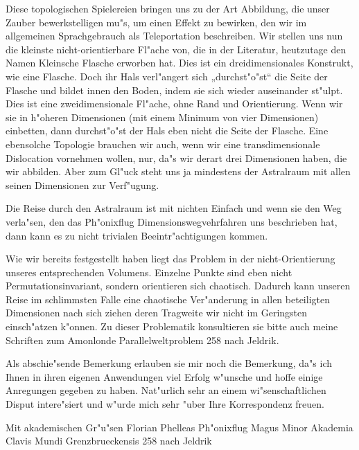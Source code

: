 \documentclass[a5paper,8pt]{book}
\begin{document}
Diese topologischen Spielereien bringen uns zu der Art Abbildung, die unser Zauber bewerkstelligen mu"s, um einen Effekt zu bewirken, den wir im allgemeinen Sprachgebrauch als Teleportation beschreiben. Wir stellen uns nun die kleinste nicht-orientierbare Fl"ache von, die in der Literatur, heutzutage den Namen Kleinsche Flasche erworben hat.
Dies ist ein dreidimensionales Konstrukt, wie eine Flasche. Doch ihr Hals verl"angert sich „durchst"o"st“ die Seite der Flasche und bildet innen den Boden, indem sie sich wieder auseinander st"ulpt.
Dies ist eine zweidimensionale Fl"ache, ohne Rand und Orientierung. Wenn wir sie in h"oheren Dimensionen (mit einem Minimum von vier Dimensionen) einbetten, dann durchst"o"st der Hals eben nicht die Seite der Flasche.
Eine ebensolche Topologie brauchen wir auch, wenn wir eine transdimensionale Dislocation vornehmen wollen, nur, da"s wir derart drei Dimensionen haben, die wir abbilden. Aber zum Gl"uck steht uns ja mindestens der Astralraum mit allen seinen Dimensionen zur Verf"ugung.

Die Reise durch den Astralraum ist mit nichten Einfach und wenn sie den Weg verla"sen, den das Ph"onixflug Dimensionswegvehrfahren uns beschrieben hat, dann kann es zu nicht trivialen Beeintr"achtigungen kommen.

Wie wir bereits festgestellt haben liegt das Problem in der nicht-Orientierung unseres entsprechenden Volumens. Einzelne Punkte sind eben nicht Permutationsinvariant, sondern orientieren sich chaotisch. Dadurch kann unseren Reise im schlimmsten Falle eine chaotische Ver"anderung in allen beteiligten Dimensionen nach sich ziehen deren Tragweite wir nicht im Geringsten einsch"atzen k"onnen.
Zu dieser Problematik konsultieren sie bitte auch meine Schriften zum Amonlonde Parallelweltproblem 258 nach Jeldrik.

\vspace{5mm}

Als abschie"sende Bemerkung erlauben sie mir noch die Bemerkung, da"s ich Ihnen in ihren eigenen Anwendungen viel Erfolg w"unsche und hoffe einige Anregungen gegeben zu haben. Nat"urlich sehr an einem wi"senschaftlichen Disput intere"siert und w"urde mich sehr "uber Ihre Korrespondenz freuen.

\vspace{10mm}

Mit akademischen Gr"u"sen
Florian Phelleas Ph"onixflug
Magus Minor Akademia Clavis Mundi Grenzbrueckensis 258 nach Jeldrik

\newpage
\end{document}
